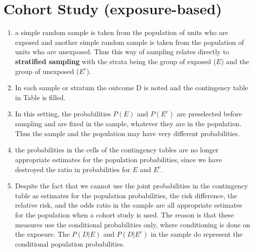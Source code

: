 \section{Cohort Study (exposure-based)}

\begin{enumerate}
    \item a simple random sample is taken from the population of units who are exposed and another simple random sample is taken from the population of units who are unexposed.
    Thus this way of sampling relates directly to \textbf{stratified sampling} with the strata being the group of exposed ($E$) and the group of unexposed ($E^c$).
    \hfill \cite{statistics/book/Statistics-for-Data-Scientists/Maurits-Kaptein}

    \item In each sample or stratum the outcome D is noted and the contingency table in Table  is filled.
    \hfill \cite{statistics/book/Statistics-for-Data-Scientists/Maurits-Kaptein}

    \item In this setting, the probabilities $P (E)$ and $P (E^c)$ are preselected before sampling and are fixed in the sample, whatever they are in the population.
    Thus the sample and the population may have very different probabilities.
    \hfill \cite{statistics/book/Statistics-for-Data-Scientists/Maurits-Kaptein}

    \item the probabilities in the cells of the contingency tables are no longer appropriate estimates for the population probabilities, since we have destroyed the ratio in probabilities for $E$ and $E^c$.
    \hfill \cite{statistics/book/Statistics-for-Data-Scientists/Maurits-Kaptein}

    \item Despite the fact that we cannot use the joint probabilities in the contingency table as estimates for the population probabilities, the risk difference, the relative risk, and the odds ratio in the sample are all appropriate estimates for the population when a cohort study is used.
    The reason is that these measures use the conditional probabilities only, where conditioning is done on the exposure. The $P (D|E)$ and $P (D|E^c)$ in the sample do represent the conditional population probabilities.
    \hfill \cite{statistics/book/Statistics-for-Data-Scientists/Maurits-Kaptein}
\end{enumerate}








